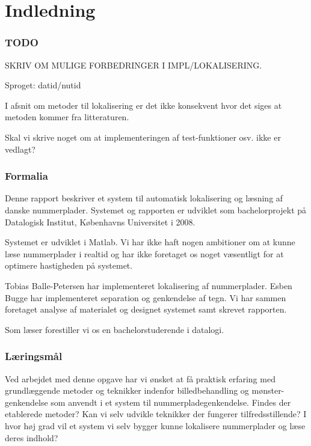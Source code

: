 \section{Indledning}

\subsubsection*{TODO}

SKRIV OM MULIGE FORBEDRINGER I IMPL/LOKALISERING.

Sproget: datid/nutid

I afsnit om metoder til lokalisering er det ikke konsekvent hvor det siges at metoden kommer fra litteraturen.

Skal vi skrive noget om at implementeringen af test-funktioner osv. ikke er vedlagt?

\subsubsection*{Formalia}
Denne rapport beskriver et system til automatisk lokalisering og læsning af danske nummerplader. Systemet og rapporten er udviklet som bachelorprojekt på Datalogisk Institut, Københavns Universitet i 2008.

Systemet er udviklet i Matlab. Vi har ikke haft nogen ambitioner om at kunne læse nummerplader i realtid og har ikke foretaget os noget væsentligt for at optimere hastigheden på systemet.

Tobias Balle-Petersen har implementeret lokalisering af nummerplader. Esben Bugge har implementeret separation og genkendelse af tegn. Vi har sammen foretaget analyse af materialet og designet systemet samt skrevet rapporten.

Som læser forestiller vi os en bachelorstuderende i datalogi.

\subsubsection*{Læringsmål}
Ved arbejdet med denne opgave har vi ønsket at få praktisk erfaring med grundlæggende metoder og teknikker indenfor billedbehandling og mønster-genkendelse som anvendt i et system til nummerpladegenkendelse. Findes der etablerede metoder? Kan vi selv udvikle teknikker der fungerer tilfredsstillende? I hvor høj grad vil et system vi selv bygger kunne lokalisere nummerplader og læse deres indhold?

